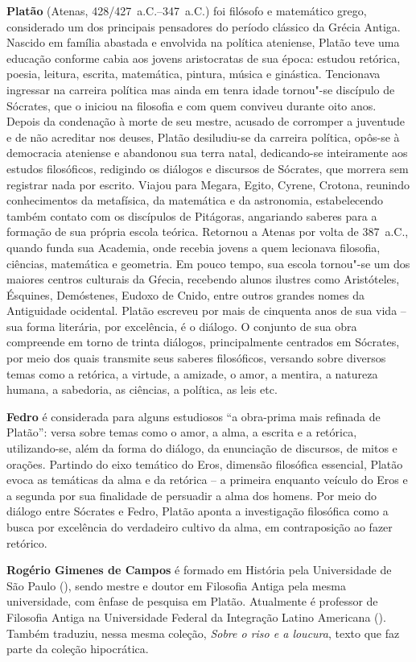 
\textbf{Platão} (Atenas, 428/427~a.C.--347~a.C.) foi filósofo e matemático grego, considerado um dos principais pensadores do período clássico da Grécia Antiga. Nascido em família abastada e envolvida na política ateniense, Platão teve uma educação conforme cabia aos jovens aristocratas de sua época: estudou retórica, poesia, leitura, escrita, matemática, pintura, música e ginástica. Tencionava ingressar na carreira política mas ainda em tenra idade tornou"-se discípulo de Sócrates, que o iniciou na filosofia e com quem conviveu durante oito anos. Depois da condenação à morte de seu mestre, acusado de corromper a juventude e de não acreditar nos deuses, Platão desiludiu-se da carreira política, opôs-se à democracia ateniense e abandonou sua terra natal, dedicando-se inteiramente aos estudos filosóficos, redigindo os diálogos e discursos de Sócrates, que morrera sem registrar nada por escrito. Viajou para Megara, Egito, Cyrene, Crotona, reunindo conhecimentos da metafísica, da matemática e da astronomia, estabelecendo também contato com os discípulos de Pitágoras, angariando saberes para a formação de sua própria escola teórica. Retornou a Atenas por volta de 387~a.C., quando funda sua Academia, onde recebia jovens a quem lecionava filosofia, ciências, matemática e geometria. Em pouco tempo, sua escola tornou"-se um dos maiores centros culturais da Gŕecia, recebendo alunos ilustres como Aristóteles, Ésquines, Demóstenes, Eudoxo de Cnido, entre outros grandes nomes da Antiguidade ocidental. Platão escreveu por mais de cinquenta anos de sua vida -- sua forma literária, por excelência, é o diálogo. O conjunto de sua obra compreende em torno de trinta diálogos, principalmente centrados em Sócrates, por meio dos quais transmite seus saberes filosóficos, versando sobre diversos temas como a retórica, a virtude, a amizade, o amor, a mentira, a natureza humana, a sabedoria, as ciências, a política, as leis etc. 

\textbf{Fedro} é considerada para alguns estudiosos ``a obra-prima mais refinada de Platão'': versa sobre temas como o amor, a alma, a escrita e a retórica, utilizando-se, além da forma do diálogo, da enunciação de discursos, de mitos e orações. Partindo do eixo temático do Eros, dimensão filosófica essencial, Platão evoca as temáticas da alma e da retórica -- a primeira enquanto veículo do Eros e a segunda por sua finalidade de persuadir a alma dos homens. Por meio do diálogo entre Sócrates e Fedro, Platão aponta a investigação filosófica como a busca por excelência do verdadeiro cultivo da alma, em contraposição ao fazer retórico. 


\textbf{Rogério Gimenes de Campos} é formado em História pela Universidade de São Paulo (), sendo mestre e doutor em Filosofia Antiga pela mesma universidade, com ênfase de pesquisa em Platão. Atualmente é professor de Filosofia Antiga na Universidade Federal da Integração Latino Americana (). Também traduziu, nessa mesma coleção, \emph{Sobre o riso e a loucura}, texto que faz parte da coleção hipocrática. 



